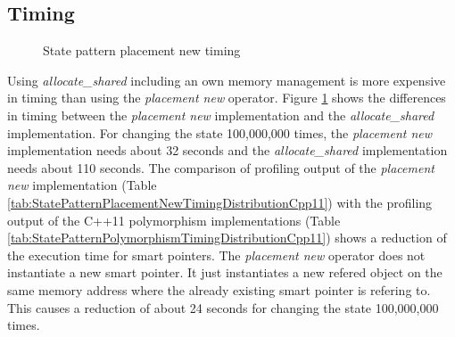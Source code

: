 {

\subsection{Timing}\label{sec:timingStatePatternPlacementNew}

\begin{figure}[h]{}
\centering
\mbox{}
\caption{State pattern placement new timing}
\label{fig:stateMachinePlacementNewTiming}
\end{figure}

\noindent Using \emph{allocate\_shared} including an own memory management is more expensive in timing than using the \emph{placement new} operator. Figure \ref{fig:stateMachinePlacementNewTiming} shows the differences in timing between the \emph{placement new} implementation and the \emph{allocate\_shared} implementation. For changing the state 100,000,000 times, the \emph{placement new} implementation needs about 32 seconds and the \emph{allocate\_shared} implementation needs about 110 seconds. The comparison of profiling output of the \emph{placement new} implementation (Table \ref{tab:StatePatternPlacementNewTimingDistributionCpp11}) with the profiling output of the C++11 polymorphism implementations (Table \ref{tab:StatePatternPolymorphismTimingDistributionCpp11}) shows a reduction of the execution time for smart pointers. The \emph{placement new} operator does not instantiate a new smart pointer. It just instantiates a new refered object on the same memory address where the already existing smart pointer is refering to. This causes a reduction of about 24 seconds for changing the state 100,000,000 times. 

}

